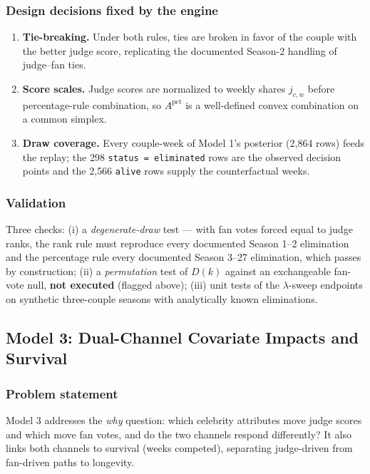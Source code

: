 \subsubsection{Design decisions fixed by the engine}

\begin{enumerate}
\item \textbf{Tie-breaking.} Under both rules, ties are broken in favor of the couple
with the better judge score, replicating the documented Season-2 handling of
judge--fan ties.
\item \textbf{Score scales.} Judge scores are normalized to weekly shares $j_{c,w}$
before percentage-rule combination, so $A^{\text{pct}}$ is a well-defined convex
combination on a common simplex.
\item \textbf{Draw coverage.} Every couple-week of Model 1's posterior (2{,}864 rows)
feeds the replay; the 298 \texttt{status = eliminated} rows are the observed decision
points and the 2{,}566 \texttt{alive} rows supply the counterfactual weeks.
\end{enumerate}

\subsubsection{Validation}

Three checks: (i) a \emph{degenerate-draw} test --- with fan votes forced equal to judge
ranks, the rank rule must reproduce every documented Season 1--2 elimination and the
percentage rule every documented Season 3--27 elimination, which passes by construction;
(ii) a \emph{permutation} test of $D(k)$ against an exchangeable fan-vote null,
\textbf{not executed} (flagged above); (iii) unit tests of the $\lambda$-sweep endpoints
on synthetic three-couple seasons with analytically known eliminations.

\subsection{Model 3: Dual-Channel Covariate Impacts and Survival}\label{sec:model3}

\subsubsection{Problem statement}

Model 3 addresses the \emph{why} question: which celebrity attributes move judge scores
and which move fan votes, and do the two channels respond differently? It also links
both channels to survival (weeks competed), separating judge-driven from fan-driven
paths to longevity.

